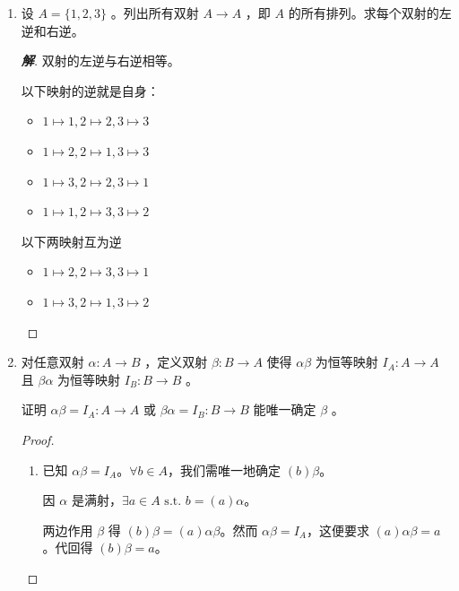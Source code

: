 \documentclass[12pt]{ctexart}
\newenvironment{solution}{\begin{proof}[\indent\bf 解]}{\end{proof}}
\begin{document}
{\begin{enumerate}
  \begin{solution}
    因 $\alpha$ 是满射，$\forall b \in B, \exists a \in A \text{ s.t. }  b = (a)\alpha$。只需指定 $(b)\beta = a$ 即可：$(b)\beta\alpha = (a)\alpha = b$。
  \end{solution}
  

  此时映射 \(\beta\) 称为 \(\alpha\) 的左逆。故满射必存在左逆。
\item 设 \(A = \{ 1,2,3\}\) 。列出所有双射 \(A \rightarrow  A\) ，即 \(A\) 的所有排列。求每个双射的左逆和右逆。

  \begin{solution}
    双射的左逆与右逆相等。

    以下映射的逆就是自身：
    \begin{itemize}
    \item $1\mapsto 1, 2\mapsto 2, 3\mapsto 3$
    \item $1\mapsto 2, 2\mapsto 1, 3\mapsto 3$
    \item $1\mapsto3, 2\mapsto 2, 3\mapsto 1$
    \item $1\mapsto1, 2\mapsto 3, 3\mapsto2$
    \end{itemize}

    以下两映射互为逆
    \begin{itemize}
    \item $1\mapsto2, 2\mapsto 3, 3\mapsto 1$
    \item $1\mapsto 3, 2\mapsto 1, 3\mapsto 2$
    \end{itemize}
  \end{solution}
  
\item 对任意双射 \(\alpha  : A \rightarrow  B\) ，定义双射 \(\beta  : B \rightarrow  A\) 使得 \({\alpha \beta }\) 为恒等映射 \(I_A : A \rightarrow  A\) 且 \({\beta \alpha }\) 为恒等映射 \(I_B : B \rightarrow  B\) 。

  证明 \({\alpha \beta } = I_A : A \rightarrow  A\) 或 \({\beta \alpha } = I_B : B \rightarrow  B\) 能唯一确定 \(\beta\) 。

  \begin{proof}
    \begin{enumerate}
    \item 已知 $\alpha\beta = I_A$。$\forall b \in A$，我们需唯一地确定 $(b)\beta$。

      因 $\alpha$ 是满射，$\exists a \in A \text{ s.t. }  b = (a)\alpha$。

      两边作用 $\beta$ 得 $(b)\beta = (a)\alpha\beta$。然而 $\alpha\beta = I_A$，这便要求 $(a)\alpha\beta = a$。代回得 $(b)\beta = a$。


\end{enumerate}
\end{proof}
\end{enumerate}}
\end{document}

